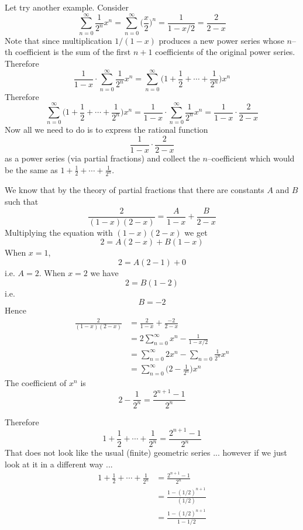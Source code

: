 













\newpage
Let try another example.
Consider
\[
\sum_{n=0}^\infty \frac{1}{2^n} x^n 
= 
\sum_{n=0}^\infty \biggl( \frac{x}{2} \biggr) ^n
=
\frac{1}{1 - x/2}
= 
\frac{2}{2 - x} 
\]
Note that since multiplication $1/(1-x)$ produces a new power series
whose $n$--th coefficient is the sum of the first $n+1$ coefficients of
the original power series.
Therefore
\[
\frac{1}{1-x} \cdot \sum_{n=0}^\infty \frac{1}{2^n} x^n 
= 
\sum_{n=0}^\infty \biggl( 1 + \frac{1}{2} + \cdots + \frac{1}{2^n} \biggr) x^n
\]
Therefore
\[
\sum_{n=0}^\infty \biggl( 1 + \frac{1}{2} + \cdots + \frac{1}{2^n} \biggr) x^n
=
\frac{1}{1-x} \cdot \sum_{n=0}^\infty \frac{1}{2^n} x^n 
=
\frac{1}{1 - x} \cdot
\frac{2}{2 - x} 
\]
Now all we need to do is to express the rational function
\[
\frac{1}{1 - x} \cdot
\frac{2}{2 - x} 
\]
as a power series (via partial fractions) and collect the $n$--coefficient
which would be the same as 
$1 + \frac{1}{2} + \cdots + \frac{1}{2^n}$.

We know that by the theory of partial fractions 
that there are constants $A$ and $B$ such that
\[
\frac{2}{(1 - x)(2 - x)} 
= \frac{A}{1 - x} + \frac{B}{2 - x}
\]
Multiplying the equation with $(1-x)(2-x)$ we get
\[
2 =  A(2 - x) + B(1 - x)
\]
When $x = 1$,
\[
2 = A(2 - 1) +  0
\]
i.e. $A = 2$.
When $x = 2$ we have
\[
2 = B(1 - 2)
\]
i.e.
\[
B = -2
\]
Hence
\begin{align*}
\frac{2}{(1 - x)(2 - x)} 
&= \frac{2}{1 - x} +  \frac{-2}{2 - x} \\
&= 2 \sum_{n=0}^\infty x^n - \frac{1}{1 - x/2} \\
&= \sum_{n=0}^\infty 2x^n - \sum_{n=0} \frac{1}{2^n} x^n \\
&= \sum_{n=0}^\infty \biggl( 2 - \frac{1}{2^n} \biggr) x^n
\end{align*}
The coefficient of $x^n$ is
\[
2 - \frac{1}{2^n} = \frac{2^{n+1} - 1}{2^n}
\]

Therefore
\[
1 + \frac{1}{2} + \cdots + \frac{1}{2^n}
=
\frac{2^{n+1} - 1}{2^n}
\]
That does not look like the usual (finite) geometric series ...
however if we just look at it in a different way ...
\begin{align*}
1 + \frac{1}{2} + \cdots + \frac{1}{2^n}
&= \frac{2^{n+1} - 1}{2^n} \\
&= \frac{1 - (1/2)^{n+1}}{(1/2)} \\
&= \frac{1 - (1/2)^{n+1}}{1 - 1/2}
\end{align*}





